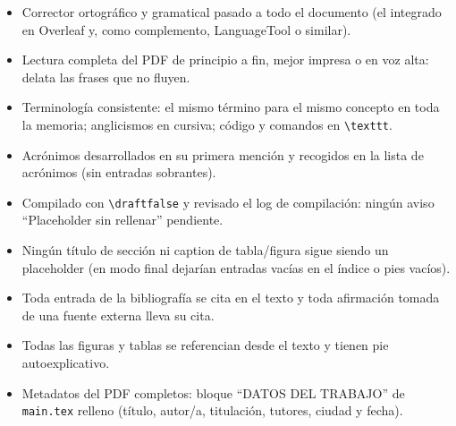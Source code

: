\begin{itemize}[itemsep=0.3em]
  \item[$\square$] Corrector ortográfico y gramatical pasado a todo el
    documento (el integrado en Overleaf y, como complemento, LanguageTool
    o similar).
  \item[$\square$] Lectura completa del PDF de principio a fin, mejor
    impresa o en voz alta: delata las frases que no fluyen.
  \item[$\square$] Terminología consistente: el mismo término para el
    mismo concepto en toda la memoria; anglicismos en cursiva; código y
    comandos en \texttt{\textbackslash texttt}.
  \item[$\square$] Acrónimos desarrollados en su primera mención y
    recogidos en la lista de acrónimos (sin entradas sobrantes).
  \item[$\square$] Compilado con \texttt{\textbackslash draftfalse} y
    revisado el log de compilación: ningún aviso \enquote{Placeholder sin
    rellenar} pendiente.
  \item[$\square$] Ningún título de sección ni caption de tabla/figura
    sigue siendo un placeholder (en modo final dejarían entradas vacías
    en el índice o pies vacíos).
  \item[$\square$] Toda entrada de la bibliografía se cita en el texto y
    toda afirmación tomada de una fuente externa lleva su cita.
  \item[$\square$] Todas las figuras y tablas se referencian desde el
    texto y tienen pie autoexplicativo.
  \item[$\square$] Metadatos del PDF completos: bloque \enquote{DATOS DEL
    TRABAJO} de \texttt{main.tex} relleno (título, autor/a, titulación,
    tutores, ciudad y fecha).
\end{itemize}
